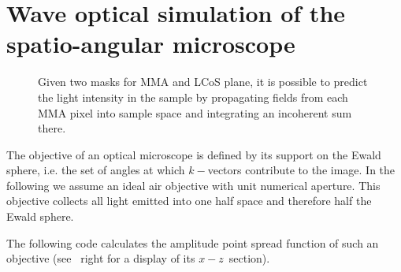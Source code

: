 \chapter{Wave optical simulation of the spatio-angular microscope}
\label{sec:sim-angle}

\begin{figure}[!hbt]
  \centering
  \def\svgscale{1.5}
  
  \caption{Given two masks for MMA and LCoS plane, it is possible to
    predict the light intensity in the sample by propagating fields
    from each MMA pixel into sample space and integrating an
    incoherent sum there.}
  \label{fig:memi-simple-app}
\end{figure}

The objective of an optical microscope is defined by its support on
the Ewald sphere, i.e. the set of angles at which $k-$vectors
contribute to the image. In the following we assume an ideal air
objective with unit numerical aperture. This objective collects all
light emitted into one half space and therefore half the Ewald sphere.

The following code calculates the amplitude point spread function of
such an objective (see ~right for a display of its
$x-z$~section).

